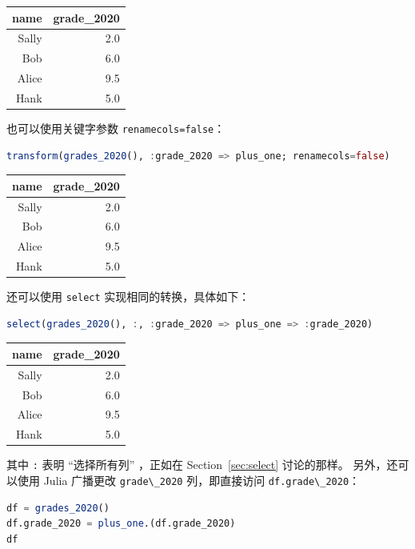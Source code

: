 \documentclass[
  notoc %
]{tufte-book}
\newcommand{\passthrough}[1]{#1}
\begin{document}
\begin{longtable}[]{@{}rr@{}}
\toprule
name & grade\_2020 \\
\midrule
\endhead
Sally & 2.0 \\
Bob & 6.0 \\
Alice & 9.5 \\
Hank & 5.0 \\
\bottomrule
\end{longtable}

也可以使用关键字参数 \passthrough{\lstinline!renamecols=false!}：

\begin{lstlisting}[language=Julia]
transform(grades_2020(), :grade_2020 => plus_one; renamecols=false)
\end{lstlisting}

\begin{longtable}[]{@{}rr@{}}
\toprule
name & grade\_2020 \\
\midrule
\endhead
Sally & 2.0 \\
Bob & 6.0 \\
Alice & 9.5 \\
Hank & 5.0 \\
\bottomrule
\end{longtable}

还可以使用 \passthrough{\lstinline!select!} 实现相同的转换，具体如下：

\begin{lstlisting}[language=Julia]
select(grades_2020(), :, :grade_2020 => plus_one => :grade_2020)
\end{lstlisting}

\begin{longtable}[]{@{}rr@{}}
\toprule
name & grade\_2020 \\
\midrule
\endhead
Sally & 2.0 \\
Bob & 6.0 \\
Alice & 9.5 \\
Hank & 5.0 \\
\bottomrule
\end{longtable}

其中 \passthrough{\lstinline!:!} 表明 ``选择所有列'' ，正如在
Section~\ref{sec:select} 讨论的那样。 另外，还可以使用 Julia 广播更改
\passthrough{\lstinline!grade\_2020!} 列，即直接访问
\passthrough{\lstinline!df.grade\_2020!}：

\begin{lstlisting}[language=Julia]
df = grades_2020()
df.grade_2020 = plus_one.(df.grade_2020)
df
\end{lstlisting}
\end{document}
